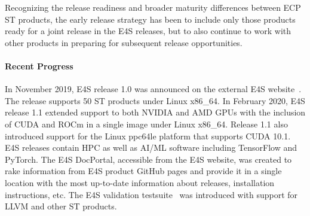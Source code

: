 Recognizing the release readiness and broader maturity differences between ECP ST products, the early release strategy has been to include only those products ready for a joint release in the E4S releases, but to also continue to work with other products in preparing for subsequent release opportunities.

\paragraph{Recent Progress}

In November 2019, E4S release 1.0 was announced on the external E4S website~\cite{e4s:homepage}. The release supports 50 ST products under Linux x86\_64. In February 2020, E4S release 1.1 extended support to both NVIDIA and AMD GPUs with the inclusion of CUDA and ROCm in a single image under Linux x86\_64. Release 1.1 also introduced support for the Linux ppc64le platform that supports CUDA 10.1. E4S releases contain HPC as well as AI/ML software including TensorFlow and PyTorch. The E4S DocPortal, accessible from the E4S website, was created to rake information from E4S product GitHub pages and provide it in a single location with the most up-to-date information about releases, installation instructions, etc. The E4S validation testsuite~\cite{e4s:validation} was introduced with support for LLVM and other ST products.



